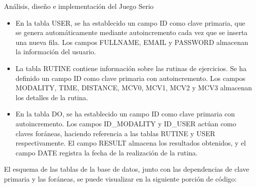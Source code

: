 \begin{thesischapter}{2} {Análisis, diseño e implementación del Juego Serio}
    \vspace{10pt}
    \begin{itemize}
        \item En la tabla USER, se ha establecido un campo ID como clave primaria, que se genera automáticamente mediante autoincremento 
        cada vez que se inserta una nueva fila. Los campos FULLNAME, EMAIL y PASSWORD almacenan la información del usuario.
    
        \item La tabla RUTINE contiene información sobre las rutinas de ejercicios. Se ha definido un campo ID como clave primaria con 
        autoincremento. Los campos MODALITY, TIME, DISTANCE, MCV0, MCV1, MCV2 y MCV3 almacenan los detalles de la rutina.
    
        \item En la tabla DO, se ha establecido un campo ID como clave primaria con autoincremento. Los campos ID\_MODALITY y ID\_USER actúan 
        como claves foráneas, haciendo referencia a las tablas RUTINE y USER respectivamente. El campo RESULT almacena los resultados obtenidos, 
        y el campo DATE registra la fecha de la realización de la rutina.
        
    \end{itemize}

    El esquema de las tablas de la base de datos, junto con las dependencias de clave primaria y las foráneas, se puede visualizar en la siguiente 
    porción de código:

    \begin{center}
        \begin{minipage}{0.60\textwidth}
        \begin{lstlisting}[language=c,caption={Hola perro}, label={holo}]
        
        \end{lstlisting}
        \end{minipage}
    
    \end{center}


\end{thesischapter}
